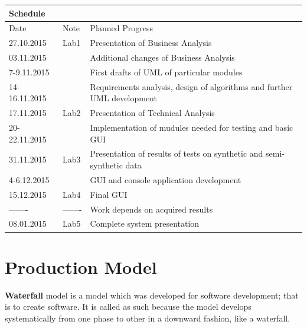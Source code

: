 \documentclass{article}
\begin{document}
\begin{center}


\begin{table}[h]

\large
\begin{tabular}{|l|l|l|}
\hline
\multicolumn{3}{|l|}{\cellcolor[HTML]{C0C0C0}Schedule} \\ \hline
Date         & Note        & Planned Progress          \\ \hline
\hline

27.10.2015   & Lab1    & Presentation of Business Analysis   \\ \hline
03.11.2015   &    & Additional changes of Business Analysis   \\ \hline
7-9.11.2015   &     & First drafts of UML of particular modules   \\ \hline
14-16.11.2015   &     & Requirements analysis, design of algorithms and further UML development \\ \hline
17.11.2015   &  Lab2   & Presentation of Technical Analysis   \\ \hline
20-22.11.2015   &     & Implementation of mudules needed for testing and basic GUI   \\ \hline
31.11.2015   & Lab3    & Presentation of results of tests on synthetic and semi-synthetic data  \\ \hline
4-6.12.2015   &     & GUI and console application development  \\ \hline
15.12.2015   & Lab4    & Final GUI  \\ \hline
-------  & -------    & Work depends on acquired results  \\ \hline
08.01.2015  & Lab5    & Complete system presentation  \\ \hline
\end{tabular}
\end{table}

\end{center}


\newpage




\section{Production Model}
{\bf Waterfall} model is a model which was developed for software development; that is to create software. It is called as such because the model develops systematically from one phase to other in a downward fashion, like a waterfall.
\end{document}
